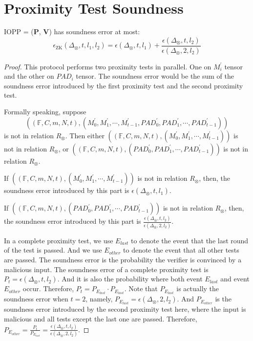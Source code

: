 \section{Proximity Test Soundness}

\begin{lemma}
\label{lemma:szkpctc-soundness}


IOPP = ($\textbf{P}$, $\textbf{V}$) has soundness error at most:
$$
    \epsilon_{\text{ZK}}(\Delta_\otimes, t, l_1, l_2) = \epsilon(\Delta_\otimes, t, l_1) + \frac{\epsilon(\Delta_\otimes, t, l_2)}{\epsilon(\Delta_\otimes, 2, l_2)}
$$

\end{lemma}
\begin{proof}


This protocol performs two proximity tests in parallel. One on $M_i^\prime$ tensor and the other on $PAD_i$ tensor. The soundness error would be the sum of the soundness error introduced by the first proximity test and the second proximity test.


Formally speaking, suppose 
$$
    ((\mathbb{F}, C, m, N, t), (M_0^{\prime}, M_1^{\prime}, \cdots, M_{t-1}^{\prime}, PAD_0^{\prime}, PAD_1^{\prime}, \cdots, PAD_{t-1}^{\prime}))
$$ 
is not in relation $R_\otimes$. Then either $((\mathbb{F}, C, m, N, t), (M_0^{\prime}, M_1^{\prime}, \cdots, M_{t-1}^{\prime}))$ is not in relation $R_\otimes$, 
or $((\mathbb{F}, C, m, N, t), (PAD_0^{\prime}, PAD_1^{\prime}, \cdots, PAD_{t-1}^{\prime}))$ is not in relation $R_\otimes$.

If $((\mathbb{F}, C, m, N, t), (M_0^{\prime}, M_1^{\prime}, \cdots, M_{t-1}^{\prime}))$ is not in relation $R_\otimes$, then, the soundness error introduced by this part is $\epsilon(\Delta_\otimes, t, l_1)$. 

If $((\mathbb{F}, C, m, N, t), (PAD_0^{\prime}, PAD_1^{\prime}, \cdots, PAD_{t-1}^{\prime}))$ is not in relation $R_\otimes$, then, the soundness error introduced by this part is $\frac{\epsilon(\Delta_\otimes, t, l_2)}{\epsilon(\Delta_\otimes, 2, l_2)}$.

In a complete proximity test, we use $E_{last}$ to denote the event that the last round of the test is passed. And we use $E_{other}$ to denote the event that all other tests are passed.
The soundness error is the probability the verifier is convinced by a malicious input.
The soundness error of a complete proximity test is $P_t = \epsilon(\Delta_\otimes, t, l_2)$. And it is also the probability where both event $E_{last}$ and event $E_{other}$ occur. Therefore, $P_t = P_{E_{last}} \cdot P_{E_{last}}$. Note that $P_{E_{last}}$ is actually the soundness error when $t=2$, namely, $P_{E_{last}} = \epsilon(\Delta_\otimes, 2, l_2)$. And $P_{E_{other}}$ is the soundness error introduced by the second proximity test here, where the input is malicious and all tests except the last one are passed. Therefore, $P_{E_{other}} = \frac{P_{t}}{P_{E_{last}}} = \frac{\epsilon(\Delta_\otimes, t, l_2)}{\epsilon(\Delta_\otimes, 2, l_2)}$.

\end{proof}


